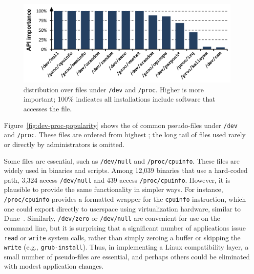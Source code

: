 \begin{figure}[t]
\centering
\includegraphics[width=5.5in]{syspop/figures/dev-proc-popularity-by-inst.pdf}
\caption[\Usagemetric{} of selected {\tt /dev} and {\tt /proc} pseudo-files]
{\usagemetric{} distribution over files under {\tt /dev} and {\tt /proc}.  Higher is more important; 100\% indicates all installations include software that accesses the file. }
\label{fig:syspop:dev-proc-popularity}
\end{figure}

Figure~\ref{fig:dev-proc-popularity} shows the \usagemetric{} of common pseudo-files under {\tt/dev} and {\tt /proc}.  
These files are ordered from highest \usagemetric{}; the long tail
of files used rarely or directly by administrators is omitted.

Some files %
are essential,
such as {\tt /dev/null} and {\tt /proc\-/\-cpuinfo}.
These files are widely used in %
binaries and scripts.
Among 12,039 binaries that use a hard-coded path,
3,324 access {\tt /dev/null} and 439 access {\tt /proc/cpuinfo}.
However, it is plausible to provide the same functionality in
simpler ways.
For instance, {\tt /proc/cpuinfo} provides a formatted wrapper for
the {\tt cpuinfo} instruction, which one could export
directly to userspace using virtualization hardware, similar to Dune~\citep{belay12dune}.
Similarly, {\tt /dev/zero} or {\tt /dev/null} are convenient for use on the command
line, but it is surprising that a significant number of applications
issue {\tt read} or {\tt write} system calls, rather than simply zeroing a buffer
or skipping the {\tt write}
(e.g., {\tt grub-install}).
Thus, in implementing a Linux compatibility layer, a small number of pseudo-files
are essential, and perhaps others could be eliminated with modest application changes.


